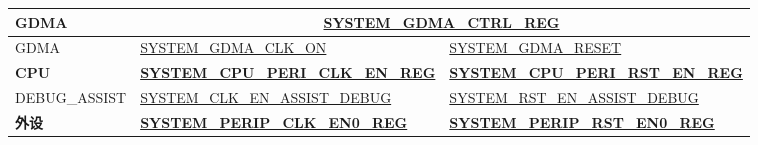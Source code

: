\documentclass[main\_\_CN.tex]{subfiles}
\begin{document}
\begin{ThreePartTable}
\begin{longtable}[c]{ |l|l|l| }
    \textbf{GDMA} & \multicolumn{2}{|c|}{\textbf{\hyperref[regdesc:SYSTEMGDMACTRLREG]{SYSTEM\_GDMA\_CTRL\_REG}}} \\\hline

    GDMA & \hyperref[fielddesc:SYSTEMGDMACLKON]{SYSTEM\_GDMA\_CLK\_ON} & \hyperref[fielddesc:SYSTEMGDMARESET]{SYSTEM\_GDMA\_RESET} \\\hline




    \textbf{CPU} & \textbf{\hyperref[regdesc:SYSTEMCPUPERICLKENREG]{SYSTEM\_CPU\_PERI\_CLK\_EN\_REG}} & \textbf{\hyperref[regdesc:SYSTEMCPUPERIRSTENREG]{SYSTEM\_CPU\_PERI\_RST\_EN\_REG}} \\ \hline
    DEBUG\_ASSIST & \hyperref[fielddesc:SYSTEMCLKENASSISTDEBUG]{SYSTEM\_CLK\_EN\_ASSIST\_DEBUG} & \hyperref[fielddesc:SYSTEMRSTENASSISTDEBUG]{SYSTEM\_RST\_EN\_ASSIST\_DEBUG} \\\hline


    \textbf{外设} & \textbf{\hyperref[regdesc:SYSTEMPERIPCLKEN0REG]{SYSTEM\_PERIP\_CLK\_EN0\_REG}} &  \textbf{\hyperref[regdesc:SYSTEMPERIPRSTEN0REG]{SYSTEM\_PERIP\_RST\_EN0\_REG}} \\ \hline


\end{longtable}
\end{ThreePartTable}
\end{document}
